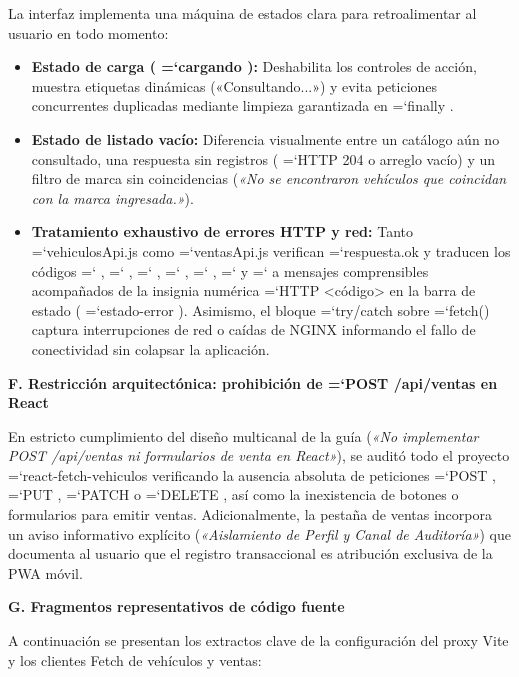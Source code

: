 \documentclass[11pt,a4paper]{article}
\renewcommand{\_}{\oldunderscore\allowbreak}
\DeclareRobustCommand{\texttt}[1]{%
  {\upshape\ttfamily\fontsize{9}{10.8}\selectfont\hyphenchar\font=`\-\relax #1}%
}
\begin{document}
\noindent La interfaz implementa una máquina de estados clara para retroalimentar al usuario en todo momento:
\begin{itemize}[leftmargin=*,itemsep=2pt,topsep=1pt]
  \item \textbf{Estado de carga (\texttt{cargando}):} Deshabilita los controles de acción, muestra etiquetas dinámicas («Consultando...») y evita peticiones concurrentes duplicadas mediante limpieza garantizada en \texttt{finally}.
  \item \textbf{Estado de listado vacío:} Diferencia visualmente entre un catálogo aún no consultado, una respuesta sin registros (\texttt{HTTP 204} o arreglo vacío) y un filtro de marca sin coincidencias (\textit{«No se encontraron vehículos que coincidan con la marca ingresada.»}).
  \item \textbf{Tratamiento exhaustivo de errores HTTP y red:} Tanto \texttt{vehiculosApi.\allowbreak{}js} como \texttt{ventasApi.\allowbreak{}js} verifican \texttt{respuesta.\allowbreak{}ok} y traducen los códigos \texttt{401}, \texttt{403}, \texttt{404}, \texttt{500}, \texttt{502}, \texttt{503} y \texttt{504} a mensajes comprensibles acompañados de la insignia numérica \texttt{HTTP <código>} en la barra de estado (\texttt{estado-error}). Asimismo, el bloque \texttt{try/catch} sobre \texttt{fetch()} captura interrupciones de red o caídas de NGINX informando el fallo de conectividad sin colapsar la aplicación.
\end{itemize}

\vspace{0.2cm}
\noindent\textbf{F. Restricción arquitectónica: prohibición de \texttt{POST /\allowbreak{}api/\allowbreak{}ventas} en React}

\noindent En estricto cumplimiento del diseño multicanal de la guía (\textit{«No implementar POST /api/ventas ni formularios de venta en React»}), se auditó todo el proyecto \texttt{react-fetch-vehiculos} verificando la ausencia absoluta de peticiones \texttt{POST}, \texttt{PUT}, \texttt{PATCH} o \texttt{DELETE}, así como la inexistencia de botones o formularios para emitir ventas. Adicionalmente, la pestaña de ventas incorpora un aviso informativo explícito (\textit{«Aislamiento de Perfil y Canal de Auditoría»}) que documenta al usuario que el registro transaccional es atribución exclusiva de la PWA móvil.

\vspace{0.2cm}
\noindent\textbf{G. Fragmentos representativos de código fuente}

\noindent A continuación se presentan los extractos clave de la configuración del proxy Vite y los clientes Fetch de vehículos y ventas:
\end{document}
